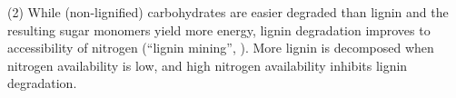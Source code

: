 \documentclass[authoryear,preprint,review,12pt]{elsarticle}
\begin{document}
                                                                                                                                                                                                                                                                                                                                                                                                                                                                                                                                                                                                                                                                                                                                                                                                                                                                                                                                                                                                                                                                                                                                                                                                                                                                                                                                                                                                                                                                                                                                        (2) While (non-lignified) carbohydrates are easier degraded than lignin and the resulting sugar monomers yield more energy, lignin degradation improves to accessibility of nitrogen (``lignin mining'', \cite{Craine2007}). More lignin is decomposed when nitrogen availability is low, and high nitrogen availability inhibits lignin degradation.
\end{document}
